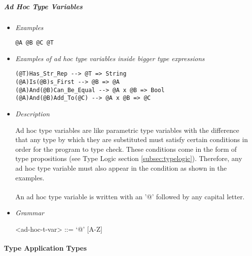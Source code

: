 \documentclass{article}
\begin{document}
\subparagraph{Ad Hoc Type Variables}

\begin{itemize}
\item \textit{Examples}
\begin{verbatim}
@A @B @C @T
\end{verbatim}

\item \textit{Examples of ad hoc type variables inside bigger type expressions}
\begin{verbatim}
(@T)Has_Str_Rep --> @T => String
(@A)Is(@B)s_First --> @B => @A
(@A)And(@B)Can_Be_Equal --> @A x @B => Bool
(@A)And(@B)Add_To(@C) --> @A x @B => @C
\end{verbatim}

\item \textit{Description}

Ad hoc type variables are like parametric type variables with the difference
that any type by which they are substituted must satisfy certain conditions in
order for the program to type check. These conditions come in the form of type
propositions (see Type Logic section \ref{subsec:typelogic}). Therefore, any ad
hoc type variable must also appear in the condition as shown in the examples.
\\\\
An ad hoc type variable is written with an '@' followed by any capital letter.

\item \textit{Grammar}
\begin{grammar}
<ad-hoc-t-var> ::= `@' [A-Z] 
\end{grammar}
\end{itemize}

\paragraph{Type Application Types}
\end{document}
